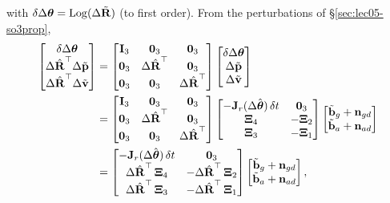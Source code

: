 with $\delta\Delta\vect{\theta} = \Log(\Delta\tilde{\vect{R}})$ (to first order). From the perturbations of \S\ref{sec:lec05-so3prop},
\begin{align}
\begin{bmatrix} \delta\Delta\vect{\theta} \\ \Delta\hat{\vect{R}}\trans\Delta\tilde{\vect{p}} \\ \Delta\hat{\vect{R}}\trans\Delta\tilde{\vect{v}} \end{bmatrix}
&= \begin{bmatrix} \vect{I}_3 & \vect{0}_3 & \vect{0}_3 \\ \vect{0}_3 & \Delta\hat{\vect{R}}\trans & \vect{0}_3 \\ \vect{0}_3 & \vect{0}_3 & \Delta\hat{\vect{R}}\trans \end{bmatrix}
\begin{bmatrix} \delta\Delta\vect{\theta} \\ \Delta\tilde{\vect{p}} \\ \Delta\tilde{\vect{v}} \end{bmatrix} \\
&= \begin{bmatrix} \vect{I}_3 & \vect{0}_3 & \vect{0}_3 \\ \vect{0}_3 & \Delta\hat{\vect{R}}\trans & \vect{0}_3 \\ \vect{0}_3 & \vect{0}_3 & \Delta\hat{\vect{R}}\trans \end{bmatrix}
\begin{bmatrix} -\vect{J}_r(\Delta\hat{\vect{\theta}})\,\delta t & \vect{0}_3 \\ \vect{\Xi}_4 & -\vect{\Xi}_2 \\ \vect{\Xi}_3 & -\vect{\Xi}_1 \end{bmatrix}
\begin{bmatrix} \tilde{\vect{b}}_g + \vect{n}_{gd} \\ \tilde{\vect{b}}_a + \vect{n}_{ad} \end{bmatrix} \\
&= \begin{bmatrix} -\vect{J}_r(\Delta\hat{\vect{\theta}})\,\delta t & \vect{0}_3 \\ \Delta\hat{\vect{R}}\trans\,\vect{\Xi}_4 & -\Delta\hat{\vect{R}}\trans\,\vect{\Xi}_2 \\ \Delta\hat{\vect{R}}\trans\,\vect{\Xi}_3 & -\Delta\hat{\vect{R}}\trans\,\vect{\Xi}_1 \end{bmatrix}
\begin{bmatrix} \tilde{\vect{b}}_g + \vect{n}_{gd} \\ \tilde{\vect{b}}_a + \vect{n}_{ad} \end{bmatrix},
\end{align}
